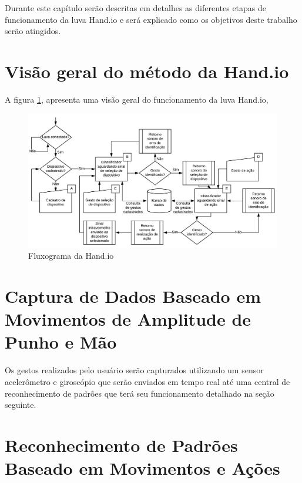 Durante este capítulo serão descritas em detalhes as diferentes etapas de funcionamento da luva Hand.io e será explicado como os objetivos deste trabalho serão atingidos.

\section{Visão geral do método da Hand.io}





A figura \ref{fig:fluxograma}, apresenta uma visão geral do funcionamento da luva Hand.io, 


\begin{figure}[ht]
    \centering
	\includegraphics[width=\textwidth, keepaspectratio]{resources/fluxograma.pdf}
	\caption{Fluxograma da Hand.io}
	\label{fig:fluxograma}
\end{figure}






\section{Captura de Dados Baseado em Movimentos de Amplitude de Punho e Mão}

Os gestos realizados pelo usuário serão capturados utilizando um sensor acelerômetro e giroscópio que serão enviados em tempo real até uma central de reconhecimento de padrões que terá seu funcionamento detalhado na seção seguinte. 



\section{Reconhecimento de Padrões Baseado em Movimentos e Ações}



